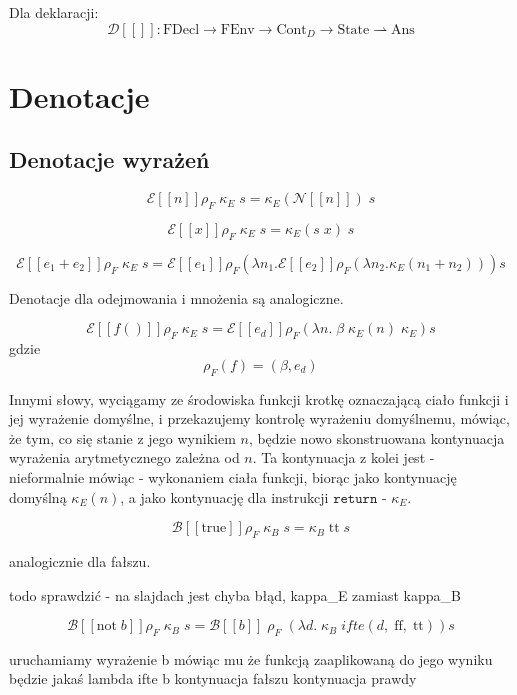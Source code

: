 \documentclass[a4paper]{article}
\begin{document}
Dla deklaracji:
$$
\mathcal{D}[\![]\!]: \text{FDecl} \longrightarrow \text{FEnv} \longrightarrow \text{Cont}_D \longrightarrow \text{State} \rightharpoonup \text{Ans}
$$


\section*{Denotacje}

\subsection*{Denotacje wyrażeń}

$$
\mathcal{E}[\![n]\!] \rho_F \; \kappa_E \; s = \kappa_E(\mathcal{N}[\![n]\!]) \; s
$$

$$
\mathcal{E}[\![ x ]\!] \rho_F \; \kappa_E \; s = \kappa_E(s \; x) \; s
$$

$$
\mathcal{E}[\![e_1 + e_2]\!] \rho_F \; \kappa_E \; s = \mathcal{E}[\![e_1]\!] \rho_F (\lambda n_1.
\mathcal{E}[\![e_2]\!] \rho_F (\lambda n_2.
\kappa_E (n_1+n_2))) s
$$

Denotacje dla odejmowania i mnożenia są analogiczne.

$$
\mathcal{E}[\![ f() ]\!] \rho_F \; \kappa_E \; s = \mathcal{E}[\![ e_d ]\!] \rho_F (\lambda n. \; \beta \; \kappa_E(n) \; \kappa_E) s
$$
gdzie
$$
\rho_F(f) = (\beta, e_d)
$$

Innymi słowy, wyciągamy ze środowiska funkcji krotkę oznaczającą ciało funkcji i jej wyrażenie domyślne, i przekazujemy kontrolę wyrażeniu domyślnemu, mówiąc, że tym, co się stanie z jego wynikiem $n$, będzie nowo skonstruowana kontynuacja wyrażenia arytmetycznego zależna od $n$. Ta kontynuacja z kolei jest - nieformalnie mówiąc - wykonaniem ciała funkcji, biorąc jako kontynuację domyślną $\kappa_E(n)$, a jako kontynuację dla instrukcji $\texttt{return}$ - $\kappa_E$.


$$
\mathcal{B}[\![ \text{true} ]\!] \rho_F \; \kappa_B \; s = \kappa_B \; \text{tt} \; s
$$

analogicznie dla fałszu.

todo sprawdzić - na slajdach jest chyba błąd, kappa_E zamiast kappa_B

$$
\mathcal{B}[\![ \text{not} \; b]\!] \rho_F \; \kappa_B \; s = \mathcal{B}[\![b]\!] \; \rho_F \; (\lambda d. \; \kappa_B \; ifte(d, \; \text{ff}, \; \text{tt})) s
$$

uruchamiamy wyrażenie b mówiąc mu że funkcją zaaplikowaną do jego wyniku będzie jakaś lambda ifte b kontynuacja fałszu kontynuacja prawdy
\end{document}
